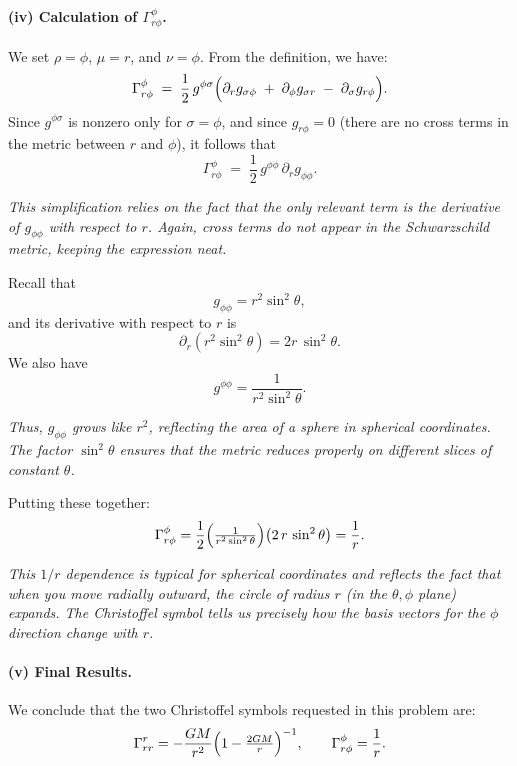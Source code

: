 \paragraph{(iv) Calculation of \(\Gamma^\phi_{r\phi}\).}
We set \(\rho = \phi\), \(\mu = r\), and \(\nu = \phi\). From the definition, we have:
\[
\Gamma^\phi_{r\phi}
\;=\;
\frac{1}{2}\,g^{\phi\sigma}
\Bigl(
\partial_r g_{\sigma \phi}
\;+\;
\partial_\phi g_{\sigma r}
\;-\;
\partial_\sigma g_{r \phi}
\Bigr).
\]
Since \(g^{\phi\sigma}\) is nonzero only for \(\sigma = \phi\), and since \(g_{r\phi} = 0\) (there are no cross terms in the metric between \(r\) and \(\phi\)), it follows that
\[
\Gamma^\phi_{r\phi}
\;=\;
\frac{1}{2} \, g^{\phi\phi}\,\partial_r g_{\phi\phi}.
\]

\emph{This simplification relies on the fact that the only relevant term is the derivative of \(g_{\phi\phi}\) with respect to \(r\). Again, cross terms do not appear in the Schwarzschild metric, keeping the expression neat.}

\smallskip

\noindent
Recall that
\[
g_{\phi\phi} 
= 
r^2 \sin^2\theta,
\]
and its derivative with respect to \(r\) is
\[
\partial_r (r^2 \sin^2\theta) 
= 
2r \,\sin^2\theta.
\]
We also have
\[
g^{\phi\phi} 
= 
\frac{1}{r^2 \sin^2\theta}.
\]

\emph{Thus, \(g_{\phi\phi}\) grows like \(r^2\), reflecting the area of a sphere in spherical coordinates. The factor \(\sin^2\theta\) ensures that the metric reduces properly on different slices of constant \(\theta\).}

\smallskip

\noindent
Putting these together:
\[
\Gamma^\phi_{r\phi}
=
\frac{1}{2}
\Bigl(\tfrac{1}{r^2 \sin^2\theta}\Bigr)
\bigl(2\,r\,\sin^2\theta\bigr)
=
\frac{1}{r}.
\]

\emph{This \(1/r\) dependence is typical for spherical coordinates and reflects the fact that when you move radially outward, the circle of radius \(r\) (in the \(\theta,\phi\) plane) expands. The Christoffel symbol tells us precisely how the basis vectors for the \(\phi\) direction change with \(r\).}

\paragraph{(v) Final Results.}
We conclude that the two Christoffel symbols requested in this problem are:
\[
\Gamma^r_{rr}
=
-\frac{GM}{r^2}
\Bigl(1 - \tfrac{2GM}{r}\Bigr)^{-1},
\qquad
\Gamma^\phi_{r\phi}
=
\frac{1}{r}.
\]


